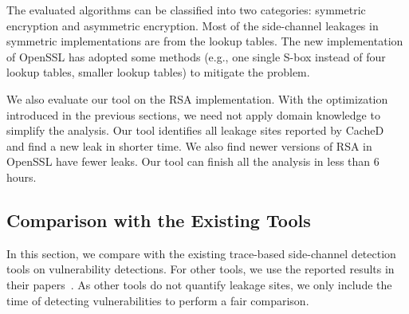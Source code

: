 The evaluated algorithms can be classified into two categories: symmetric
encryption and asymmetric encryption. Most of the side-channel leakages in symmetric implementations are from the lookup tables. The new implementation of OpenSSL has adopted some methods (e.g., one single S-box instead of four lookup tables, smaller lookup tables) to mitigate the problem. 

We also evaluate our tool on the RSA implementation. With the optimization
introduced in the previous sections, we need not apply domain knowledge to
simplify the analysis. Our tool identifies all leakage sites
reported by CacheD~\cite{203878} and find a new leak in shorter time.
We also find newer versions of RSA in OpenSSL have fewer leaks. Our tool can
finish all the analysis in less than 6 hours. 

\subsection{Comparison with the Existing Tools}
\label{eval:scala}

In this section, we compare \detect{} with the
existing trace-based side-channel detection tools on vulnerability detections. For other tools, we use the reported results in their papers~\cite{203878}. As other tools do not quantify leakage sites, we only include the time of detecting vulnerabilities to perform a fair comparison.

